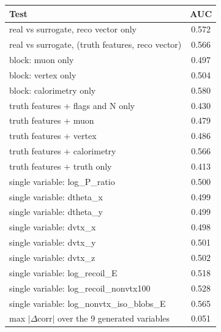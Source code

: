 \begin{tabular}{lc}
\toprule
Test & AUC \\
\midrule
real vs surrogate, reco vector only & 0.572 \\
real vs surrogate, (truth features, reco vector) & 0.566 \\
\midrule
block: muon only & 0.497 \\
block: vertex only & 0.504 \\
block: calorimetry only & 0.580 \\
truth features + flags and N only & 0.430 \\
truth features + muon & 0.479 \\
truth features + vertex & 0.486 \\
truth features + calorimetry & 0.566 \\
truth features + truth only & 0.413 \\
single variable: log\_P\_ratio & 0.500 \\
single variable: dtheta\_x & 0.499 \\
single variable: dtheta\_y & 0.499 \\
single variable: dvtx\_x & 0.498 \\
single variable: dvtx\_y & 0.501 \\
single variable: dvtx\_z & 0.502 \\
single variable: log\_recoil\_E & 0.518 \\
single variable: log\_recoil\_nonvtx100 & 0.528 \\
single variable: log\_nonvtx\_iso\_blobs\_E & 0.565 \\
\midrule
max $|\Delta$corr$|$ over the 9 generated variables & 0.051 \\
\bottomrule
\end{tabular}

